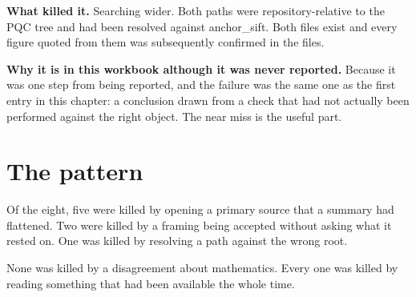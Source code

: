\textbf{What killed it.} Searching wider. Both paths were repository-relative to the PQC tree and
had been resolved against anchor\_sift. Both files exist and every figure quoted from them was
subsequently confirmed in the files.

\textbf{Why it is in this workbook although it was never reported.} Because it was one step from
being reported, and the failure was the same one as the first entry in this chapter: a conclusion
drawn from a check that had not actually been performed against the right object. The near miss is
the useful part.

\section{The pattern}

Of the eight, five were killed by opening a primary source that a summary had flattened. Two were
killed by a framing being accepted without asking what it rested on. One was killed by
resolving a path against the wrong root.

None was killed by a disagreement about mathematics. Every one was killed by reading something that
had been available the whole time.

